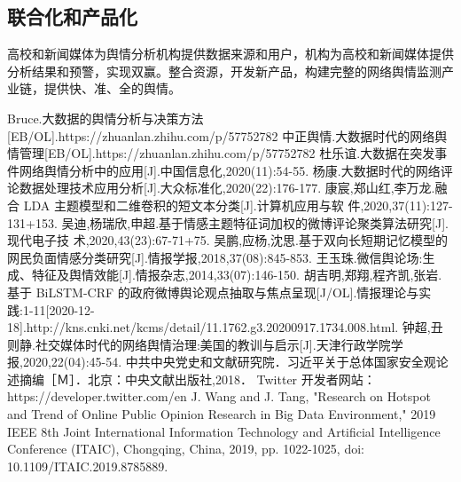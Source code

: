 \documentclass[11pt,a4paper,utf8]{article}
\begin{document}
\subsection{联合化和产品化}
高校和新闻媒体为舆情分析机构提供数据来源和用户，机构为高校和新闻媒体提供分析结果和预警，实现双赢。整合资源，开发新产品，构建完整的网络舆情监测产业链，提供快、准、全的舆情。
 
\newpage %
\begin{thebibliography}{99}  
\small
{}Bruce.大数据的舆情分析与决策方法[EB/OL].https://zhuanlan.zhihu.com/p/57752782
中正舆情.大数据时代的网络舆情管理[EB/OL].https://zhuanlan.zhihu.com/p/57752782
杜乐谊.大数据在突发事件网络舆情分析中的应用[J].中国信息化,2020(11):54-55.
杨康.大数据时代的网络评论数据处理技术应用分析[J].大众标准化,2020(22):176-177.
康宸,郑山红,李万龙.融合 LDA 主题模型和二维卷积的短文本分类[J].计算机应用与软
件,2020,37(11):127-131+153.
吴迪,杨瑞欣,申超.基于情感主题特征词加权的微博评论聚类算法研究[J].现代电子技
术,2020,43(23):67-71+75.
吴鹏,应杨,沈思.基于双向长短期记忆模型的网民负面情感分类研究[J].情报学报,2018,37(08):845-853.
王玉珠.微信舆论场:生成、特征及舆情效能[J].情报杂志,2014,33(07):146-150.
胡吉明,郑翔,程齐凯,张岩.基于 BiLSTM-CRF 的政府微博舆论观点抽取与焦点呈现[J/OL].情报理论与实
践:1-11[2020-12-18].http://kns.cnki.net/kcms/detail/11.1762.g3.20200917.1734.008.html.
钟超,丑则静.社交媒体时代的网络舆情治理:美国的教训与启示[J].天津行政学院学
报,2020,22(04):45-54.
中共中央党史和文献研究院．习近平关于总体国家安全观论述摘编［Ｍ］．北京：中央文献出版社,2018．
Twitter 开发者网站：https://developer.twitter.com/en
J. Wang and J. Tang, "Research on Hotspot and Trend of Online Public Opinion Research in Big Data 
Environment," 2019 IEEE 8th Joint International Information Technology and Artificial Intelligence Conference 
(ITAIC), Chongqing, China, 2019, pp. 1022-1025, doi: 10.1109/ITAIC.2019.8785889.
\end{thebibliography}
 
\end{document}
